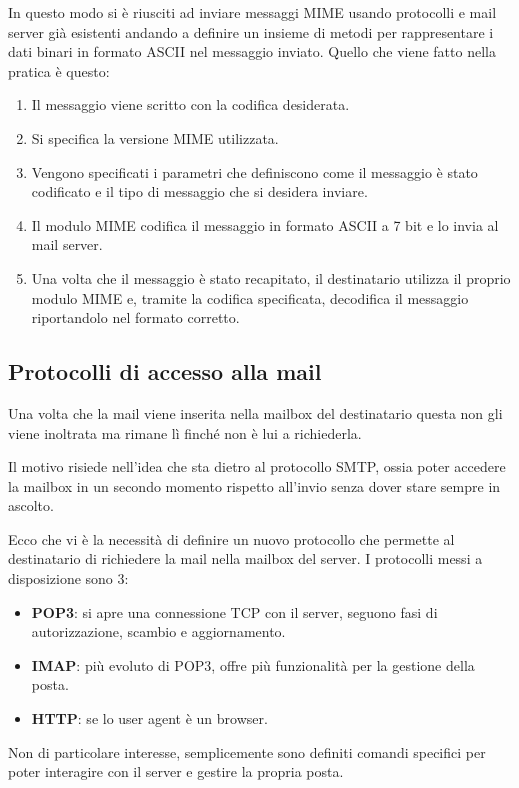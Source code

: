 In questo modo si è riusciti ad inviare messaggi MIME usando protocolli
e mail server già esistenti andando a definire un insieme di metodi per
rappresentare i dati binari in formato ASCII nel messaggio inviato. 
Quello che viene fatto nella pratica è questo:
\begin{enumerate}
	\item Il messaggio viene scritto con la codifica desiderata.
	\item Si specifica la versione MIME utilizzata.
	\item Vengono specificati i parametri che definiscono come il 
		messaggio è stato codificato e il tipo di messaggio che si 
		desidera inviare.
	\item Il modulo MIME codifica il messaggio in formato ASCII a 7 
		bit e lo invia al mail server.
	\item Una volta che il messaggio è stato recapitato, il 
		destinatario utilizza il proprio modulo MIME e, tramite la 
		codifica specificata, decodifica il messaggio riportandolo 
		nel formato corretto.
\end{enumerate}

\subsection{Protocolli di accesso alla mail}
Una volta che la mail viene inserita nella mailbox del destinatario 
questa non gli viene inoltrata ma rimane lì finché non è lui a 
richiederla.

Il motivo risiede nell'idea che sta dietro al protocollo SMTP, ossia 
poter accedere la mailbox in un secondo momento rispetto all'invio 
senza dover stare sempre in ascolto.

Ecco che vi è la necessità di definire un nuovo protocollo che permette
al destinatario di richiedere la mail nella mailbox del server. I 
protocolli messi a disposizione sono 3:
\begin{itemize}
	\item \textbf{POP3}: si apre una connessione TCP con il server,
		seguono fasi di autorizzazione, scambio e aggiornamento.
	\item \textbf{IMAP}: più evoluto di POP3, offre più funzionalità 
		per la gestione della posta.
	\item \textbf{HTTP}: se lo user agent è un browser.
\end{itemize}
Non di particolare interesse, semplicemente sono definiti comandi 
specifici per poter interagire con il server e gestire la propria 
posta.
